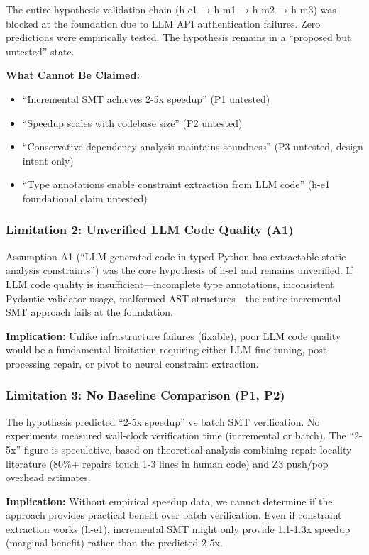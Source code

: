 The entire hypothesis validation chain (h-e1 → h-m1 → h-m2 → h-m3) was blocked at the foundation due to LLM API authentication failures. Zero predictions were empirically tested. The hypothesis remains in a ``proposed but untested'' state.

\textbf{What Cannot Be Claimed:}
\begin{itemize}
\item ``Incremental SMT achieves 2-5x speedup'' (P1 untested)
\item ``Speedup scales with codebase size'' (P2 untested)
\item ``Conservative dependency analysis maintains soundness'' (P3 untested, design intent only)
\item ``Type annotations enable constraint extraction from LLM code'' (h-e1 foundational claim untested)
\end{itemize}

\subsubsection{Limitation 2: Unverified LLM Code Quality (A1)}

Assumption A1 (``LLM-generated code in typed Python has extractable static analysis constraints'') was the core hypothesis of h-e1 and remains unverified. If LLM code quality is insufficient---incomplete type annotations, inconsistent Pydantic validator usage, malformed AST structures---the entire incremental SMT approach fails at the foundation.

\textbf{Implication:} Unlike infrastructure failures (fixable), poor LLM code quality would be a fundamental limitation requiring either LLM fine-tuning, post-processing repair, or pivot to neural constraint extraction.

\subsubsection{Limitation 3: No Baseline Comparison (P1, P2)}

The hypothesis predicted ``2-5x speedup'' vs batch SMT verification. No experiments measured wall-clock verification time (incremental or batch). The ``2-5x'' figure is speculative, based on theoretical analysis combining repair locality literature (80\%+ repairs touch 1-3 lines in human code) and Z3 push/pop overhead estimates.

\textbf{Implication:} Without empirical speedup data, we cannot determine if the approach provides practical benefit over batch verification. Even if constraint extraction works (h-e1), incremental SMT might only provide 1.1-1.3x speedup (marginal benefit) rather than the predicted 2-5x.

